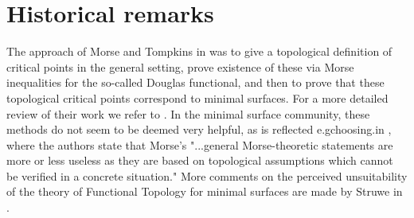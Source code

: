 
\section{Historical remarks} \label{sec:historical}

The approach of Morse and Tompkins in \cite{Morse.1939} was to give a topological definition of critical points in the general setting, prove existence of these via Morse inequalities for the so-called Douglas functional, and then to prove that these topological critical points correspond to minimal surfaces. For a more detailed review of their work we refer to \cite{Struwe.1988}. In the minimal surface community, these methods do not seem to be deemed very helpful, as is reflected e.gchoosing.\@ in \cite[p.472]{MR2566897}, where the authors state that Morse's "...general Morse-theoretic statements are more or less useless as they are based on topological assumptions which cannot be verified in a concrete situation." More comments on the perceived unsuitability of the theory of Functional Topology for minimal surfaces are made by Struwe in \cite{MR850612}. 

